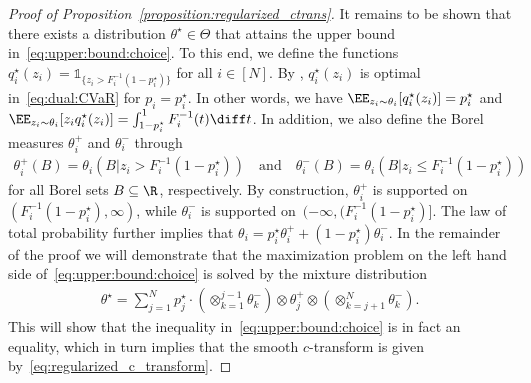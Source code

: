 \documentclass[11pt, a4paper, oneside, reqno]{article}
\begin{document}
\begin{proof}[Proof of Proposition~\ref{proposition:regularized_ctrans}]
    It remains to be shown that there exists a distribution $\theta^\star \in \Theta$ that attains the upper bound in~\eqref{eq:upper:bound:choice}.
    To this end, we define the functions $ q_i^\star(z_i) = \mathds{1}_{\{ z_i > F_i^{-1}(1 - p_i^\star) \}}$ for all $i \in [N]$.
    By \citep[Remark~4.48]{follmer2004stochastic}, $q_i^\star(z_i)$ is optimal in~\eqref{eq:dual:CVaR} for $p_i=p_i^\star$. In other words, we have $\EE_{z_i \sim \theta_i} [q_i^\star(z_i)] = p_i^\star$ and $\EE_{z_i \sim \theta_i}[z_i q_i^\star(z_i)] = \int_{1 - p_i^\star}^1 F_i^{-1}(t) \diff t$.
    In addition, we also define the Borel measures $\theta_i^+$ and $\theta_i^-$ through
    \begin{align*}
        \theta_i^+(B) = \theta_i(B | z_i > F_i^{-1}(1 - p_i^\star)) 
        \quad \text{and} \quad
        \theta_i^-(B) = \theta_i(B | z_i \leq F_i^{-1}(1 - p_i^\star)) 
    \end{align*}
    for all Borel sets $B \subseteq \R$, respectively. By construction, $\theta_i^+$ is supported on~$(F_i^{-1}(1 - p_i^\star), \infty)$, while $\theta_i^-$ is supported on~$(-\infty, (F_i^{-1}(1 - p_i^\star)]$. The law of total probability further implies that $\theta_i = p_i^\star \theta_i^+ + (1 - p_i^\star) \theta_i^-$. %
    In the remainder of the proof we will demonstrate that the maximization problem on the left hand side of~\eqref{eq:upper:bound:choice} is solved by the mixture distribution
    \begin{align*}
        \theta^\star = \sum_{j=1}^N p_j^\star \cdot \left( \otimes_{k=1}^{j-1} \theta_k^- \right) \otimes \theta_j^+ \otimes \left( \otimes_{k=j+1}^{N} \theta_k^- \right).
    \end{align*}
    This will show that the inequality in~\eqref{eq:upper:bound:choice} is in fact an equality, which in turn implies that the smooth $c$-transform is given by~\eqref{eq:regularized_c_transform}.

\end{proof}
\end{document}

